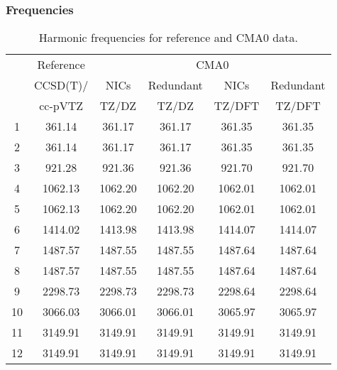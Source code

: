 \documentclass[10pt,oneside]{article}
\begin{document}
\begin{table}[h!]
\subsubsection*{Frequencies}
\centering
\caption{Harmonic frequencies for reference and CMA0 data.}
\begin{tabular}{cccccc}
\toprule
{} & Reference & \multicolumn{4}{c}{CMA0} \\
{} &  CCSD(T)/ &    NICs &  Redundant &    NICs & Redundant \\
{} &   cc-pVTZ &   TZ/DZ &      TZ/DZ &  TZ/DFT &    TZ/DFT \\
\midrule
1  &    361.14 &  361.17 &     361.17 &  361.35 &    361.35 \\
2  &    361.14 &  361.17 &     361.17 &  361.35 &    361.35 \\
3  &    921.28 &  921.36 &     921.36 &  921.70 &    921.70 \\
4  &   1062.13 & 1062.20 &    1062.20 & 1062.01 &   1062.01 \\
5  &   1062.13 & 1062.20 &    1062.20 & 1062.01 &   1062.01 \\
6  &   1414.02 & 1413.98 &    1413.98 & 1414.07 &   1414.07 \\
7  &   1487.57 & 1487.55 &    1487.55 & 1487.64 &   1487.64 \\
8  &   1487.57 & 1487.55 &    1487.55 & 1487.64 &   1487.64 \\
9  &   2298.73 & 2298.73 &    2298.73 & 2298.64 &   2298.64 \\
10 &   3066.03 & 3066.01 &    3066.01 & 3065.97 &   3065.97 \\
11 &   3149.91 & 3149.91 &    3149.91 & 3149.91 &   3149.91 \\
12 &   3149.91 & 3149.91 &    3149.91 & 3149.91 &   3149.91 \\
\bottomrule
\end{tabular}
\end{table}
\end{document}
